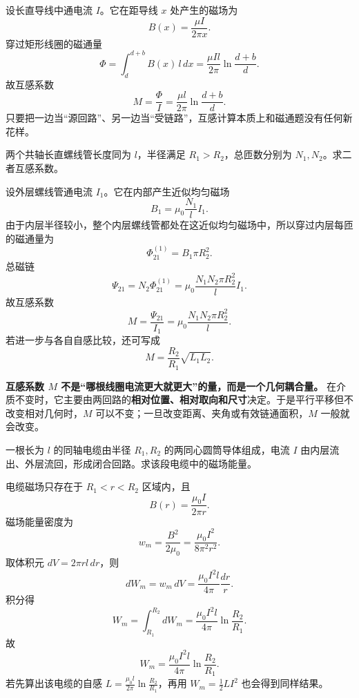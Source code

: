 \documentclass[lang=cn,11pt]{elegantbook}
\begin{document}
\begin{solution}
设长直导线中通电流 \(I\)。它在距导线 \(x\) 处产生的磁场为
\[
B(x)=\frac{\mu I}{2\pi x}.
\]
穿过矩形线圈的磁通量
\[
\Phi=\int_d^{d+b}B(x)\,l\,dx
=\frac{\mu Il}{2\pi}\ln\frac{d+b}{d}.
\]
故互感系数
\[
\boxed{
M=\frac{\Phi}{I}
=\frac{\mu l}{2\pi}\ln\frac{d+b}{d}
}.
\]
只要把一边当“源回路”、另一边当“受链路”，互感计算本质上和磁通题没有任何新花样。
\end{solution}

\begin{example}[共轴长直螺线管的互感]
两个共轴长直螺线管长度同为 \(l\)，半径满足 \(R_1>R_2\)，总匝数分别为 \(N_1,N_2\)。求二者互感系数。
\end{example}

\begin{solution}
设外层螺线管通电流 \(I_1\)。它在内部产生近似均匀磁场
\[
B_1=\mu_0\frac{N_1}{l}I_1.
\]
由于内层半径较小，整个内层螺线管都处在这近似均匀磁场中，所以穿过内层每匝的磁通量为
\[
\Phi_{21}^{(1)}=B_1\pi R_2^2.
\]
总磁链
\[
\Psi_{21}=N_2\Phi_{21}^{(1)}
=\mu_0\frac{N_1N_2\pi R_2^2}{l}I_1.
\]
故互感系数
\[
\boxed{
M=\frac{\Psi_{21}}{I_1}
=\mu_0\frac{N_1N_2\pi R_2^2}{l}.
}
\]
若进一步与各自自感比较，还可写成
\[
M=\frac{R_2}{R_1}\sqrt{L_1L_2}.
\]
\end{solution}

\begin{remark}
\textbf{互感系数 \(M\) 不是“哪根线圈电流更大就更大”的量，而是一个几何耦合量。} 在介质不变时，它主要由两回路的\textbf{相对位置、相对取向和尺寸}决定。于是平行平移但不改变相对几何时，\(M\) 可以不变；一旦改变距离、夹角或有效链通面积，\(M\) 一般就会改变。
\end{remark}

\begin{example}[同轴电缆中的磁场能量]
一根长为 \(l\) 的同轴电缆由半径 \(R_1,R_2\) 的两同心圆筒导体组成，电流 \(I\) 由内层流出、外层流回，形成闭合回路。求该段电缆中的磁场能量。
\end{example}

\begin{solution}
电缆磁场只存在于 \(R_1<r<R_2\) 区域内，且
\[
B(r)=\frac{\mu_0I}{2\pi r}.
\]
磁场能量密度为
\[
w_m=\frac{B^2}{2\mu_0}
=\frac{\mu_0I^2}{8\pi^2r^2}.
\]
取体积元 \(dV=2\pi r l\,dr\)，则
\[
dW_m=w_m\,dV
=\frac{\mu_0I^2l}{4\pi}\frac{dr}{r}.
\]
积分得
\[
W_m=\int_{R_1}^{R_2}dW_m
=\frac{\mu_0I^2l}{4\pi}\ln\frac{R_2}{R_1}.
\]
故
\[
\boxed{
W_m=\frac{\mu_0I^2l}{4\pi}\ln\frac{R_2}{R_1}
}.
\]
若先算出该电缆的自感 \(L=\frac{\mu_0l}{2\pi}\ln\frac{R_2}{R_1}\)，再用 \(W_m=\frac12LI^2\) 也会得到同样结果。
\end{solution}
\end{document}
